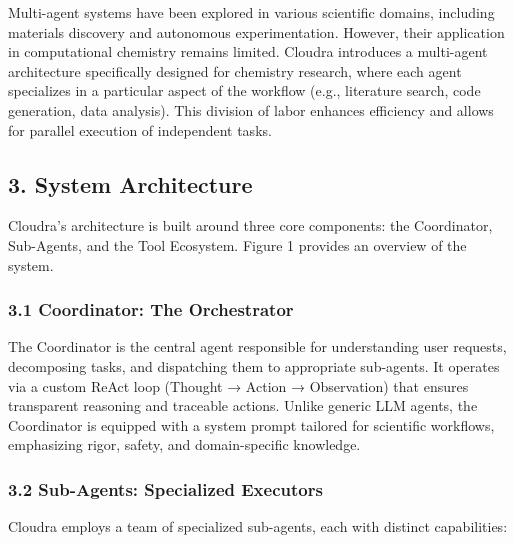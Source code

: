 Multi-agent systems have been explored in various scientific domains,
including materials discovery and autonomous experimentation. However,
their application in computational chemistry remains limited. Cloudra
introduces a multi-agent architecture specifically designed for
chemistry research, where each agent specializes in a particular aspect
of the workflow (e.g., literature search, code generation, data
analysis). This division of labor enhances efficiency and allows for
parallel execution of independent tasks.

\hypertarget{system-architecture}{%
\subsection{3. System Architecture}\label{system-architecture}}

Cloudra's architecture is built around three core components: the
Coordinator, Sub-Agents, and the Tool Ecosystem. Figure 1 provides an
overview of the system.

\hypertarget{coordinator-the-orchestrator}{%
\subsubsection{3.1 Coordinator: The
Orchestrator}\label{coordinator-the-orchestrator}}

The Coordinator is the central agent responsible for understanding user
requests, decomposing tasks, and dispatching them to appropriate
sub-agents. It operates via a custom ReAct loop (Thought → Action →
Observation) that ensures transparent reasoning and traceable actions.
Unlike generic LLM agents, the Coordinator is equipped with a system
prompt tailored for scientific workflows, emphasizing rigor, safety, and
domain-specific knowledge.

\hypertarget{sub-agents-specialized-executors}{%
\subsubsection{3.2 Sub-Agents: Specialized
Executors}\label{sub-agents-specialized-executors}}

Cloudra employs a team of specialized sub-agents, each with distinct
capabilities:

